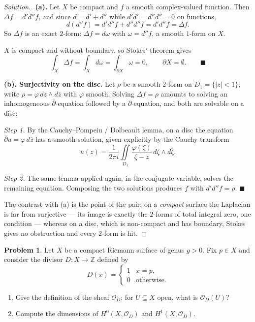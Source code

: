 \documentclass[11pt,a4paper]{article}
\theoremstyle{definition}
\newtheorem{problemx}{Problem}[section]
\newenvironment{problem}{\begin{problemx}}{\end{problemx}}
\newenvironment{solution}
  {\renewcommand{\qedsymbol}{}\begin{proof}[\textit{Solution}.]}
  {\end{proof}}
\begin{document}
\begin{solution}
\textbf{(a).} Let $X$ be compact and $f$ a smooth complex-valued function. Then
$\Delta f = d'd''f$, and since $d = d' + d''$ while $d'd' = d''d'' = 0$ on
functions,
$$d\left(d''f\right) = d'd''f + d''d''f = d'd''f = \Delta f .$$
So $\Delta f$ is an exact $2$-form: $\Delta f = d\omega$ with $\omega = d''f$, a
smooth $1$-form on $X$.

$X$ is compact and without boundary, so Stokes' theorem gives
$$\int_{X}\Delta f = \int_{X} d\omega = \int_{\partial X}\omega = 0 ,
\qquad \partial X = \emptyset . \qquad \blacksquare$$

\textbf{(b). Surjectivity on the disc.} Let $\rho$ be a smooth $2$-form on
$D_1 = \{\left|z\right|<1\}$; write $\rho = \varphi\,dz \wedge d\overline{z}$ with
$\varphi$ smooth. Solving $\Delta f = \rho$ amounts to solving an inhomogeneous
$\overline{\partial}$-equation followed by a $\partial$-equation, and both are
solvable on a disc:

\emph{Step 1.} By the Cauchy--Pompeiu / Dolbeault lemma, on a disc the equation
$\overline{\partial} u = \varphi\,d\overline{z}$ has a smooth solution, given
explicitly by the Cauchy transform
$$u(z) = \frac{1}{2\pi i}\iint\limits_{D_1}
\frac{\varphi(\zeta)}{\zeta - z}\,d\zeta\wedge d\overline{\zeta}.$$

\emph{Step 2.} The same lemma applied again, in the conjugate variable, solves the
remaining equation. Composing the two solutions produces $f$ with
$d'd''f = \rho$. $\blacksquare$

The contrast with (a) is the point of the pair: on a \emph{compact} surface the
Laplacian is far from surjective --- its image is exactly the $2$-forms of total
integral zero, one condition --- whereas on a disc, which is non-compact and has
boundary, Stokes gives no obstruction and every $2$-form is hit.
\end{solution}


\begin{problem}
Let $X$ be a compact Riemann surface of genus $g > 0$. Fix $p \in X$ and consider
the divisor $D : X \rightarrow \mathbb{Z}$ defined by
$$D(x) = \begin{cases} 1 & x = p,\\ 0 & \text{otherwise.}\end{cases}$$
\begin{enumerate}
\item[(a).] Give the definition of the sheaf $\mathcal{O}_D$: for $U \subseteq X$
open, what is $\mathcal{O}_D(U)$?
\item[(b).] Compute the dimensions of $H^{0}(X, \mathcal{O}_D)$ and
$H^{1}(X, \mathcal{O}_D)$.
\end{enumerate}
\end{problem}
\end{document}

